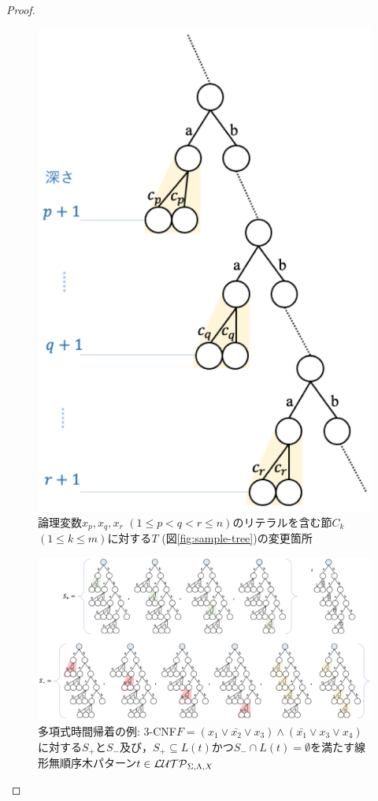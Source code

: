 \begin{proof}
\begin{figure}[tb]
  \centering
  \includegraphics[scale=0.5]{fig/clause-tree.eps}
  \caption{論理変数$x_p,x_q,x_r$ $(1\leq p < q < r \leq n)$のリテラルを含む節$C_k$ $(1\leq k\leq m)$に対する$T$ (図\ref{fig:sample-tree})の変更箇所}\label{fig:clause-tree}
\end{figure}

\begin{figure}[tb]
  \centering
  \includegraphics[scale=0.42]{fig/example_npc.eps}
  \caption{多項式時間帰着の例: 3-CNF$F=(x_{1}\vee \bar{x_{2}}\vee x_{3})\wedge(\bar{x_{1}}\vee x_{3}\vee x_{4})$に対する$S_{+}$と$S_{-}$及び，$S_+\subseteq L(t)$かつ$S_-\cap L(t)=\emptyset$を満たす線形無順序木パターン$t\in {\cal LUTP}_{\Sigma,\Lambda,X}$}\label{fig:example_npc}
\end{figure}


\end{proof}
